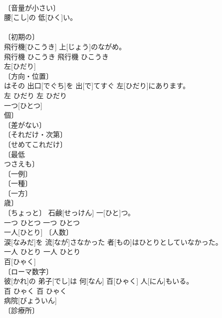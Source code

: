 \documentclass[8pt]{extreport}
\begin{document}
\begin{CJK}{UTF8}{min}
\\	〔音量が小さい〕 
\\	腰[こし]の 低[ひく]い。	
\\	[⇒こし１ 
\\	低い	ひくい	低い	ひくい	
\\	飛行機[ひこうき]	
\\	〔初期の〕 
\\	飛行機[ひこうき] 上[じょう]のながめ。	
\\	飛行機	ひこうき	飛行機	ひこうき	
\\	左[ひだり]	
\\	〔方向・位置〕 
\\	[⇒ひだりがわ, ひだりて 
\\	〔左の手〕 
\\	〔酒好き〕 
\\	〔思想的な左翼〕 
\\	〈集合的に〉 
\\	〔左派〕 
\\	[⇒ひだりより１ 
\\	交番[こうばん]はその 出口[でぐち]を 出[で]てすぐ 左[ひだり]にあります。	
\\	左	ひだり	左	ひだり	
\\	一つ[ひとつ]	
\\	個〕 
\\	〔差がない〕 
\\	〔それだけ・次第〕 
\\	〔せめてこれだけ〕 
\\	〔最低 
\\	つさえも〕 
\\	〔一例〕 
\\	〔一種〕 
\\	〔一方〕 
\\	歳〕 
\\	〔ちょっと〕	石鹸[せっけん] 一[ひと]つ。	
\\	一つ	ひとつ	一つ	ひとつ	
\\	一人[ひとり]	〔人数〕 
\\	[⇒ひとり２]	涙[なみだ]を 流[なが]さなかった 者[もの]はひとりとしていなかった。	
\\	一人	ひとり	一人	ひとり	
\\	百[ひゃく]	
\\	〔ローマ数字〕 
\\	彼[かれ]の 弟子[でし]は 何[なん] 百[ひゃく] 人[にん]もいる。	
\\	百	ひゃく	百	ひゃく	
\\	病院[びょういん]	
\\	〔診療所〕 

\end{CJK}
\end{document}

